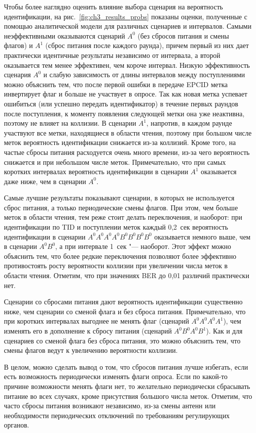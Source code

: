 Чтобы более наглядно оценить влияние выбора сценария на вероятность идентификации, на рис.~\ref{fig:ch3_results_probs} показаны оценки, полученные с помощью аналитической модели для различных сценариев и интервалов. Самыми неэффективными оказываются сценарий $A^0$ (без сбросов питания и смены флагов) и $A^1$ (сброс питания после каждого раунда), причем первый из них дает практически идентичные результаты независимо от интервала, а второй оказывается тем менее эффективен, чем короче интервал. Низкую эффективность сценария $A^0$ и слабую зависимость от длины интервалов между поступлениями можно объяснить тем, что после первой ошибки в передаче EPCID метка инвертирует флаг и больше не участвует в опросе. Так как новая метка успевает ошибиться (или успешно передать идентификатор) в течение первых раундов после поступления, к моменту появления следующей метки она уже неактивна, поэтому не влияет на коллизии. В сценарии $A^1$, напротив, в каждом раунде участвуют все метки, находящиеся в области чтения, поэтому при большом числе меток вероятность идентификации снижается из-за коллизий. Кроме того, на частые сбросы питания расходуется очень много времени, из-за чего вероятность снижается и при небольшом числе меток. Примечательно, что при самых коротких интервалах вероятность идентификации в сценарии $A^1$ оказывается даже ниже, чем в сценарии $A^0$.

Самые лучшие результаты показывают сценарии, в которых не используется сброс питания, а только периодические смены флагов. При этом, чем больше меток в области чтения, тем реже стоит делать переключения, и наоборот: при идентификации по TID и поступлении меток каждый 0,2~сек вероятность идентификации в сценарии $A^0A^0A^0A^0B^0B^0B^0B^0$ оказывается немного выше, чем в сценарии $A^0B^0$, а при интервале 1~сек "--- наоборот. Этот эффект можно объяснить тем, что более редкие переключения позволяют более эффективно противостоять росту вероятности коллизии при увеличении числа меток в области чтения. Отметим, что при значениях BER до 0,01 различий практически нет.

Сценарии со сбросами питания дают вероятность идентификации существенно ниже, чем сценарии со сменой флага и без сброса питания. Примечательно, что при коротких интервалах выгоднее не менять флаг (сценарий $A^0A^0A^0A^1$), чем изменять его в дополнение к сбросу питания (сценарий $A^0B^0A^0B^1$). Как и для сценариев со сменой флага без сброса питания, это можно объяснить тем, что смены флагов ведут к увеличению вероятности коллизии.

В целом, можно сделать вывод о том, что сбросов питания лучше избегать, если есть возможность периодически изменять флаги опроса. Если по какой-то причине возможности менять флаги нет, то желательно периодически сбрасывать питание во всех случаях, кроме присутствия большого числа меток. Отметим, что часто сбросы питания возникают независимо, из-за смены антенн или необходимости периодических отключений по требованиям регулирующих органов.


